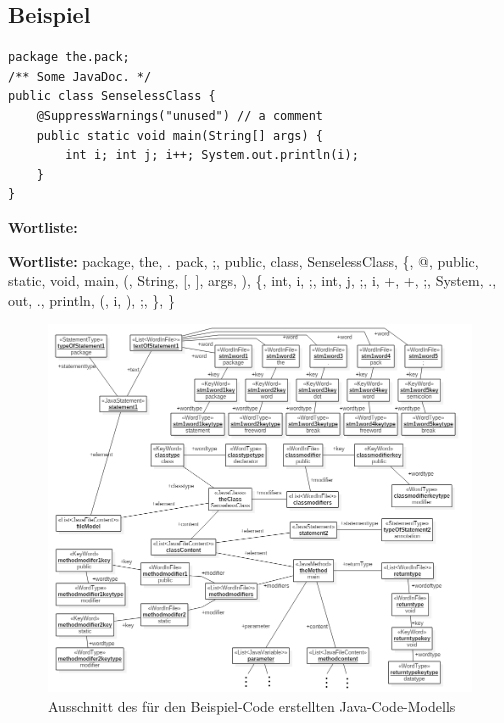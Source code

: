 \documentclass[gb,ngerman]{stthesis}
\begin{document}
			\subsection{Beispiel}
				\begin{lstlisting}[frame=single]
package the.pack;
/** Some JavaDoc. */
public class SenselessClass {
   	@SuppressWarnings("unused") // a comment
   	public static void main(String[] args) {
    	int i; int j; i++; System.out.println(i);
    }
}
				\end{lstlisting}
				\begin{labeling} {\textbf{Wortliste:}}
				\item [\textbf{Wortliste:}] package, the, . pack, ;, public, class, SenselessClass, \{, @, public, static, void, main, (, String, [, ], args, ), \{, int, i, ;, int, j, ;, i, +, +, ;, System, ., out, ., println, (, i, ), ;, \}, \}
				\end{labeling}
				\begin{figure} [!h]
					\includegraphics [width=\textwidth] {instance.png}
					\caption{Ausschnitt des für den Beispiel-Code erstellten Java-Code-Modells}
				\end{figure}
\end{document}
